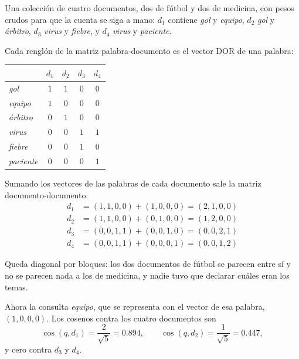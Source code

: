 \documentclass[11pt,letterpaper]{article}
\begin{document}
\begin{ejemplo}
    Una colección de cuatro documentos, dos de fútbol y dos de
    medicina, con pesos crudos para que la cuenta se siga a mano:
    $d_1$ contiene \textit{gol} y \textit{equipo}, $d_2$
    \textit{gol} y \textit{árbitro}, $d_3$ \textit{virus} y
    \textit{fiebre}, y $d_4$ \textit{virus} y \textit{paciente}.

    Cada renglón de la matriz palabra-documento es el vector DOR de
    una palabra:

    \begin{center}
    \begin{tabular}{lcccc}
        \toprule
        & $d_1$ & $d_2$ & $d_3$ & $d_4$ \\
        \midrule
        \textit{gol}      & $1$ & $1$ & $0$ & $0$ \\
        \textit{equipo}   & $1$ & $0$ & $0$ & $0$ \\
        \textit{árbitro}  & $0$ & $1$ & $0$ & $0$ \\
        \textit{virus}    & $0$ & $0$ & $1$ & $1$ \\
        \textit{fiebre}   & $0$ & $0$ & $1$ & $0$ \\
        \textit{paciente} & $0$ & $0$ & $0$ & $1$ \\
        \bottomrule
    \end{tabular}
    \end{center}

    Sumando los vectores de las palabras de cada documento sale la
    matriz documento-documento:
    \begin{align*}
        d_1 &= (1,1,0,0) + (1,0,0,0) = (2,1,0,0) \\
        d_2 &= (1,1,0,0) + (0,1,0,0) = (1,2,0,0) \\
        d_3 &= (0,0,1,1) + (0,0,1,0) = (0,0,2,1) \\
        d_4 &= (0,0,1,1) + (0,0,0,1) = (0,0,1,2)
    \end{align*}

    Queda diagonal por bloques: los dos documentos de fútbol se
    parecen entre sí y no se parecen nada a los de medicina, y nadie
    tuvo que declarar cuáles eran los temas.

    Ahora la consulta \textit{equipo}, que se representa con el
    vector de esa palabra, $(1,0,0,0)$. Los cosenos contra los cuatro
    documentos son
    \[
        \cos(q, d_1) = \frac{2}{\sqrt{5}} = 0.894 ,
        \qquad
        \cos(q, d_2) = \frac{1}{\sqrt{5}} = 0.447 ,
    \]
    y cero contra $d_3$ y $d_4$.
\end{ejemplo}
\end{document}
